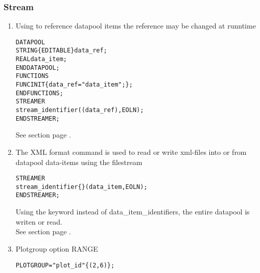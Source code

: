 \subsubsection{Stream}
\begin{enumerate}
\item Using \VAR{} to reference datapool items the reference may be changed at runntime \\

\begin{boxedminipage}[t]{\linewidth}
\begin{alltt}
  DATAPOOL
    STRING \{EDITABLE\} data\_ref;
    REAL data\_item;
  END DATAPOOL;
  FUNCTIONS
    FUNC INIT \{ data\_ref = "data\_item"; \};
  END FUNCTIONS;
  STREAMER
    stream\_identifier (\VAR(data_ref), EOLN);
  END STREAMER;
\end{alltt}
\end{boxedminipage}

See section  page \pageref{sec:stvariables}. \\
\item The XML format command is used to read or write xml-files into or from
datapool data-items using the filestream \\

\begin{boxedminipage}[t]{\linewidth}
\begin{alltt}
  STREAMER
    stream\_identifier \{\XML\} (data\_item, EOLN);
  END STREAMER;
\end{alltt}
\end{boxedminipage}

Using the keyword \DATAPOOL{} instead of data\_item\_identifiers,
the entire datapool is writen or read. \\
See section  page \pageref{sec:stxmlcommand}. \\
\item Plotgroup option RANGE \\

\begin{boxedminipage}[t]{\linewidth}
\begin{alltt}
  PLOTGROUP = "plot_id" \{\RANGE ( 2, 6 )\};
\end{alltt}
\end{boxedminipage}


\end{enumerate}

